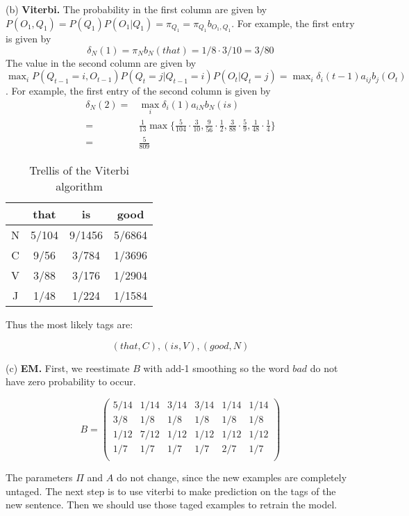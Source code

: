 \documentclass[10pt]{article}
\begin{document}
(b) \textbf{Viterbi.} The probability in the first column are given by $P(O_1, Q_1)=P(Q_1)P(O_1|Q_1)=\pi_{Q_1}=\pi_{Q_1}b_{O_1, Q_1}$. For example, the first entry is given by
\[
	\delta_N(1) = \pi_N b_{N}(that) = 1/8 \cdot 3/10 = 3/80
\]
The value in the second column are given by $\max_i P(Q_{t-1}=i, O_{t-1}) P(Q_t=j|Q_{t-1}=i)P(O_t|Q_t=j)=\max_i\delta_i(t-1)a_{ij}b_j(O_t)$. For example, the first entry of the second column is given by
\begin{equation}
	\begin{split}
		\delta_N(2) 
			=& \max_i \delta_i(1)a_{iN}b_N(is) \\
			=& \frac{1}{13}\max \{
				\frac{5}{104}\cdot \frac{3}{10},
				\frac{9}{56}\cdot \frac{1}{2},
				\frac{3}{88}\cdot \frac{5}{9},
				\frac{1}{48}\cdot \frac{1}{4}
			\}\\
			=& \frac{5}{809}
	\end{split}
\end{equation}
\begin{table}[h!]
	\centering
	\begin{tabular}{ c|c|c|c| }
		& that & is & good  \\
		\hline
		N & 5/104 & 9/1456 & 5/6864 \\
		\hline
		C & 9/56 & 3/784 & 1/3696 \\
		\hline
		V & 3/88 & 3/176 & 1/2904 \\
		\hline
		J & 1/48 & 1/224 & 1/1584 \\
		\hline
	\end{tabular}
	\caption{Trellis of the Viterbi algorithm}
	\label{table:result}
\end{table}

Thus the most likely tags are:

\[
	(that, C), (is, V), (good, N)
\]

(c) \textbf{EM.} First, we reestimate $B$ with add-1 smoothing so the word $bad$ do not have zero probability to occur.

\[
	B = 
	\begin{pmatrix}
		5/14 & 1/14 & 3/14 & 3/14 & 1/14 & 1/14\\
		3/8 & 1/8 & 1/8 & 1/8 & 1/8 & 1/8 \\
		1/12 & 7/12 & 1/12 & 1/12 & 1/12 & 1/12\\
		1/7 & 1/7 & 1/7 & 1/7 & 2/7 & 1/7 \\
	\end{pmatrix}
\]

The parameters $\Pi$ and $A$ do not change, since the new examples are completely untaged. The next step is to use viterbi to make prediction on the tags of the new sentence. Then we should use those taged examples to retrain the model.\\
\end{document}
